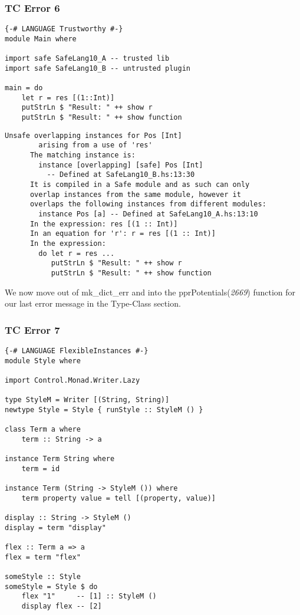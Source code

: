 \documentclass[a4paper]{article}
\begin{document}
\subsubsection{TC Error 6}

\begin{lstlisting}[label={lst: T20.0}, numbers=none, caption={Example Program \cite{ex20}}]
{-# LANGUAGE Trustworthy #-}
module Main where

import safe SafeLang10_A -- trusted lib
import safe SafeLang10_B -- untrusted plugin

main = do
    let r = res [(1::Int)]
    putStrLn $ "Result: " ++ show r 
    putStrLn $ "Result: " ++ show function
\end{lstlisting}

\begin{lstlisting}[label={lst: T20.0.2}, numbers=none, caption={Error}]
      Unsafe overlapping instances for Pos [Int]
        arising from a use of 'res'
      The matching instance is:
        instance [overlapping] [safe] Pos [Int]
          -- Defined at SafeLang10_B.hs:13:30
      It is compiled in a Safe module and as such can only
      overlap instances from the same module, however it
      overlaps the following instances from different modules:
        instance Pos [a] -- Defined at SafeLang10_A.hs:13:10
      In the expression: res [(1 :: Int)]
      In an equation for 'r': r = res [(1 :: Int)]
      In the expression:
        do let r = res ...
           putStrLn $ "Result: " ++ show r
           putStrLn $ "Result: " ++ show function
\end{lstlisting}

We now move out of mk\_dict\_err and into the pprPotentials(\textit{2669}) function for our last error message in the Type-Class section. 

\subsubsection{TC Error 7}

\begin{lstlisting}[label={lst: T21.0}, numbers=none, caption={Example Program \cite{ex21}}]
{-# LANGUAGE FlexibleInstances #-}
module Style where

import Control.Monad.Writer.Lazy

type StyleM = Writer [(String, String)]
newtype Style = Style { runStyle :: StyleM () }

class Term a where
    term :: String -> a

instance Term String where
    term = id

instance Term (String -> StyleM ()) where
    term property value = tell [(property, value)]

display :: String -> StyleM ()
display = term "display"

flex :: Term a => a
flex = term "flex"

someStyle :: Style
someStyle = Style $ do
    flex "1"     -- [1] :: StyleM ()
    display flex -- [2]
\end{lstlisting}
\end{document}
